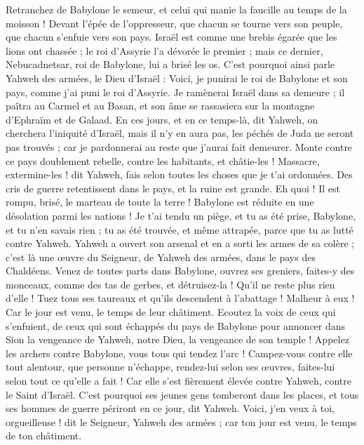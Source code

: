 \begin{multicols}{2}
Retranchez de Babylone le semeur, et celui qui manie la faucille au temps de la moisson ! Devant l'épée de l'oppresseur, que chacun se tourne vers son peuple, que chacun s'enfuie vers son pays.
Israël est comme une brebis égarée que les lions ont chassée ; le roi d'Assyrie l'a dévorée le premier ; mais ce dernier, Nebucadnetsar, roi de Babylone, lui a brisé les os.
C'est pourquoi ainsi parle Yahweh des armées, le Dieu d'Israël : Voici, je punirai le roi de Babylone et son pays, comme j'ai puni le roi d'Assyrie.
Je ramènerai Israël dans sa demeure ; il paîtra au Carmel et au Basan, et son âme se rassasiera sur la montagne d'Ephraïm et de Galaad.
En ces jours, et en ce temps-là, dit Yahweh, on cherchera l'iniquité d'Israël, mais il n'y en aura pas, les péchés de Juda ne seront pas trouvés ; car je pardonnerai au reste que j'aurai fait demeurer.
Monte contre ce pays doublement rebelle, contre les habitants, et châtie-les ! Massacre, extermine-les ! dit Yahweh, fais selon toutes les choses que je t'ai ordonnées.
Des cris de guerre retentissent dans le pays, et la ruine est grande.
Eh quoi ! Il est rompu, brisé, le marteau de toute la terre ! Babylone est réduite en une désolation parmi les nations !
Je t'ai tendu un piège, et tu as été prise, Babylone, et tu n'en savais rien ; tu as été trouvée, et même attrapée, parce que tu as lutté contre Yahweh.
Yahweh a ouvert son arsenal et en a sorti les armes de sa colère ; c'est là une œuvre du Seigneur, de Yahweh des armées, dans le pays des Chaldéens.
Venez de toutes parts dans Babylone, ouvrez ses greniers, faites-y des monceaux, comme des tas de gerbes, et détruisez-la ! Qu'il ne reste plus rien d'elle !
Tuez tous ses taureaux et qu'ils descendent à l'abattage ! Malheur à eux ! Car le jour est venu, le temps de leur châtiment.
Ecoutez la voix de ceux qui s'enfuient, de ceux qui sont échappés du pays de Babylone pour annoncer dans Sion la vengeance de Yahweh, notre Dieu, la vengeance de son temple !
Appelez les archers contre Babylone, vous tous qui tendez l'arc ! Campez-vous contre elle tout alentour, que personne n'échappe, rendez-lui selon ses œuvres, faites-lui selon tout ce qu'elle a fait ! Car elle s'est fièrement élevée contre Yahweh, contre le Saint d'Israël.
C'est pourquoi ses jeunes gens tomberont dans les places, et tous ses hommes de guerre périront en ce jour, dit Yahweh.
Voici, j'en veux à toi, orgueilleuse ! dit le Seigneur, Yahweh des armées ; car ton jour est venu, le temps de ton châtiment.

\end{multicols}
